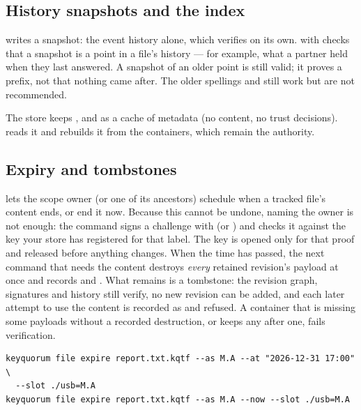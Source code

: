\subsection{History snapshots and the index}

 writes a  snapshot: the event
history alone, which verifies on its own. 
with  checks that a snapshot is a point in a file's history --- for
example, what a partner held when they last answered. A snapshot of an older
point is still valid; it proves a prefix, not that nothing came after. The older spellings
 and  still work but are
not recommended.

The store keeps ,  and
 as a cache of metadata (no content, no trust
decisions).  reads it and  rebuilds it
from the containers, which remain the authority.

\subsection{Expiry and tombstones}

 lets the scope owner (or one of its ancestors) schedule
when a tracked file's content ends, or end it now. Because this cannot be
undone, naming the owner is not enough: the command signs a challenge with
 (or ) and checks it against the key
your store has registered for that label. The key is opened only for that
proof and released before anything changes. When the time has passed,
the next command that needs the content destroys \emph{every} retained
revision's payload at once and records  and
. What remains is a tombstone: the revision graph,
signatures and history still verify, no new revision can be added, and each
later attempt to use the content is recorded as
 and refused. A container that is missing some
payloads without a recorded destruction, or keeps any after one, fails
verification.

\begin{lstlisting}
keyquorum file expire report.txt.kqtf --as M.A --at "2026-12-31 17:00" \
  --slot ./usb=M.A
keyquorum file expire report.txt.kqtf --as M.A --now --slot ./usb=M.A
\end{lstlisting}

